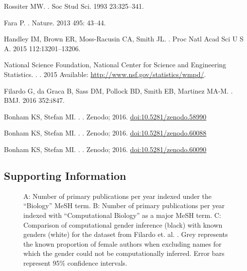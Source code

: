 \documentclass[10pt,letterpaper]{article}
\providecommand{\DIFaddbeginFL}{} %
\newcommand{\DIFaddincludegraphics}[2][]{{\color{blue}\fbox{\DIFOincludegraphics[#1]{#2}}}} %
\DeclareRobustCommand{\DIFaddbeginFL}{\DIFOaddbeginFL \let\includegraphics\DIFaddincludegraphics} %
\begin{document}
\begin{flushleft}
\begin{thebibliography}{10}
Rossiter MW.
.
\newblock  Soc Stud Sci. 1993 23:325–341.


Fara P.
.
\newblock Nature. 2013  495: 43–44.

Handley IM, Brown ER, Moss-Racusin CA, Smith JL.
.
\newblock  Proc Natl Acad Sci U S A.  2015 112:13201–13206.


National Science Foundation, National Center for Science and Engineering Statistics.
.
\newblock  [Internet]. 2015 Available: \url{http://www.nsf.gov/statistics/wmpd/}.

 Filardo G, da Graca B, Sass DM, Pollock BD, Smith EB, Martinez MA-M.
.
\newblock BMJ. 2016 352:i847.


Bonham KS, Stefan MI.
.
\newblock   [Internet]. Zenodo; 2016. \url{doi:10.5281/zenodo.58990}

Bonham KS, Stefan MI.
.
\newblock  [Internet]. Zenodo; 2016. \url{doi:10.5281/zenodo.60088}

 Bonham KS, Stefan MI.
.
\newblock  [Internet]. Zenodo; 2016. \url{doi:10.5281/zenodo.60090}

\end{thebibliography}

\subsection*{Supporting Information}

\begin{figure}[!h]
  \caption{
  A: Number of primary publications per year indexed under the “Biology” MeSH term. B: Number of primary publications per year indexed with “Computational Biology” as a major MeSH term. C: Comparison of computational gender inference (black) with known genders (white) for the dataset from Filardo et. al. \cite{Filardo2016}. Grey represents the known proportion of female authors when excluding names for which the gender could not be computationally inferred. Error bars represent 95\% confidence intervals.}
  \label{S1 Fig}
\DIFaddbeginFL \end{figure}


\end{flushleft}
\end{document}
